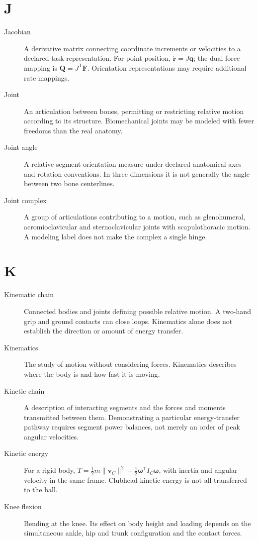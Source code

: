 \section*{J}
\begin{description}

\item[Jacobian] A derivative matrix connecting coordinate increments or velocities to a declared task representation. For point position, $\dot{\mathbf{r}}=J\dot{\mathbf{q}}$; the dual force mapping is $\mathbf{Q}=J^\mathsf{T}\mathbf{F}$. Orientation representations may require additional rate mappings.

\item[Joint] An articulation between bones, permitting or restricting relative motion according to its structure. Biomechanical joints may be modeled with fewer freedoms than the real anatomy.

\item[Joint angle] A relative segment-orientation measure under declared anatomical axes and rotation conventions. In three dimensions it is not generally the angle between two bone centerlines.

\item[Joint complex] A group of articulations contributing to a motion, such as glenohumeral, acromioclavicular and sternoclavicular joints with scapulothoracic motion. A modeling label does not make the complex a single hinge.

\end{description}
\section*{K}
\begin{description}

\item[Kinematic chain] Connected bodies and joints defining possible relative motion. A two-hand grip and ground contacts can close loops. Kinematics alone does not establish the direction or amount of energy transfer.

\item[Kinematics] The study of motion without considering forces. Kinematics describes where the body is and how fast it is moving.

\item[Kinetic chain] A description of interacting segments and the forces and moments transmitted between them. Demonstrating a particular energy-transfer pathway requires segment power balances, not merely an order of peak angular velocities.

\item[Kinetic energy] For a rigid body, $T=\tfrac12 m\|\mathbf{v}_C\|^2+\tfrac12\boldsymbol{\omega}^\mathsf{T}I_C\boldsymbol{\omega}$, with inertia and angular velocity in the same frame. Clubhead kinetic energy is not all transferred to the ball.

\item[Knee flexion] Bending at the knee. Its effect on body height and loading depends on the simultaneous ankle, hip and trunk configuration and the contact forces.

\end{description}
